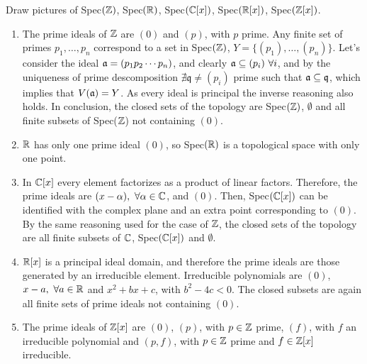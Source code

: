 \begin{ex}
	Draw pictures of Spec$(\mathbb{Z})$, Spec$(\mathbb{R})$, Spec$(\mathbb{C}[x])$, Spec$(\mathbb{R}[x])$, Spec$(\mathbb{Z}[x])$.
\end{ex}

\begin{sol}
	\begin{enumerate}[label=(\roman*)]
		\item The prime ideals of $\mathbb{Z}$ are $(0)$ and $(p)$, with $p$ prime. Any finite set of primes $p_1, \dots, p_n$ correspond to a set in Spec$(\mathbb{Z})$, $Y = \{(p_1), \dots, (p_n)\}$. Let's consider the ideal $\mathfrak{a} = (p_1p_2 \cdots p_n)$, and clearly $\mathfrak{a} \subseteq (p_i) \, \, \forall i$, and by the uniqueness of prime descomposition $\nexists \mathfrak{q} \neq (p_i)$ prime such that $\mathfrak{a} \subseteq \mathfrak{q}$, which implies that $V(\mathfrak{a}) = Y$. As every ideal is principal the inverse reasoning also holds. In conclusion, the closed sets of the topology are Spec$(\mathbb{Z})$, $\emptyset$ and all finite subsets of Spec($\mathbb{Z}$) not containing $(0)$.

		\item $\mathbb{R}$ has only one prime ideal $(0)$, so Spec$(\mathbb{R})$ is a topological space with only one point.

		\item In $\mathbb{C}[x]$ every element factorizes as a product of linear factors. Therefore, the prime ideals are $(x-\alpha), \, \, \forall \alpha \in \mathbb{C}$, and $(0)$. Then, Spec$(\mathbb{C}[x])$ can be identified with the complex plane and an extra point corresponding to $(0)$. By the same reasoning used for the case of $\mathbb{Z}$, the closed sets of the topology are all finite subsets of $\mathbb{C}$, Spec$(\mathbb{C}[x])$ and $\emptyset$.

		\item $\mathbb{R}[x]$ is a principal ideal domain, and therefore the prime ideals are those generated by an irreducible element. Irreducible polynomials are $(0)$, $x-a, \, \, \forall a \in \mathbb{R}$ and $x^2 +bx +c$, with $b^2-4c < 0$. The closed subsets are again all finite sets of prime ideals not containing $(0)$.

		\item The prime ideals of $\mathbb{Z}[x]$ are $(0)$, $(p)$, with $p \in \mathbb{Z}$ prime, $(f)$, with $f$ an irreducible polynomial and $(p,f)$, with $p \in \mathbb{Z}$ prime and $f \in \mathbb{Z}[x]$ irreducible.
	\end{enumerate}
\end{sol}

